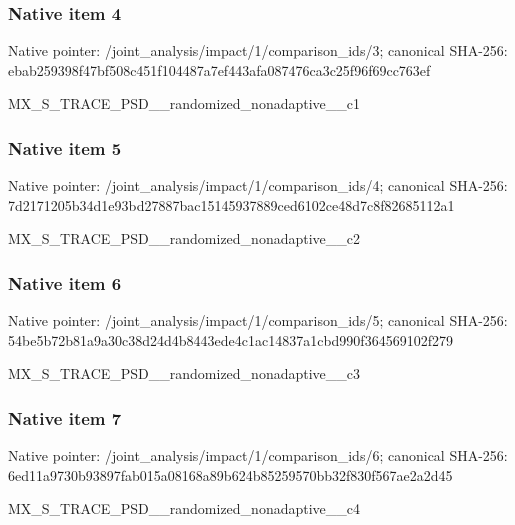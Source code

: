 \documentclass[10pt,a4paper]{article}
\begin{document}
\subsubsection{Native item 4}
Native pointer: /joint\_\allowbreak{}analysis/impact/1/comparison\_\allowbreak{}ids/3; canonical SHA-256: ebab259398f47bf508c451f104487a7ef443afa087476ca3c25f96f69cc763ef

\begingroup\raggedright\sloppy MX\_\allowbreak{}S\_\allowbreak{}TRACE\_\allowbreak{}PSD\_\allowbreak{}\_\allowbreak{}randomized\_\allowbreak{}nonadaptive\_\allowbreak{}\_\allowbreak{}c1\par\endgroup

\subsubsection{Native item 5}
Native pointer: /joint\_\allowbreak{}analysis/impact/1/comparison\_\allowbreak{}ids/4; canonical SHA-256: 7d2171205b34d1e93bd27887bac15145937889ced6102ce48d7c8f82685112a1

\begingroup\raggedright\sloppy MX\_\allowbreak{}S\_\allowbreak{}TRACE\_\allowbreak{}PSD\_\allowbreak{}\_\allowbreak{}randomized\_\allowbreak{}nonadaptive\_\allowbreak{}\_\allowbreak{}c2\par\endgroup

\subsubsection{Native item 6}
Native pointer: /joint\_\allowbreak{}analysis/impact/1/comparison\_\allowbreak{}ids/5; canonical SHA-256: 54be5b72b81a9a30c38d24d4b8443ede4c1ac14837a1cbd990f364569102f279

\begingroup\raggedright\sloppy MX\_\allowbreak{}S\_\allowbreak{}TRACE\_\allowbreak{}PSD\_\allowbreak{}\_\allowbreak{}randomized\_\allowbreak{}nonadaptive\_\allowbreak{}\_\allowbreak{}c3\par\endgroup

\subsubsection{Native item 7}
Native pointer: /joint\_\allowbreak{}analysis/impact/1/comparison\_\allowbreak{}ids/6; canonical SHA-256: 6ed11a9730b93897fab015a08168a89b624b85259570bb32f830f567ae2a2d45

\begingroup\raggedright\sloppy MX\_\allowbreak{}S\_\allowbreak{}TRACE\_\allowbreak{}PSD\_\allowbreak{}\_\allowbreak{}randomized\_\allowbreak{}nonadaptive\_\allowbreak{}\_\allowbreak{}c4\par\endgroup
\end{document}
